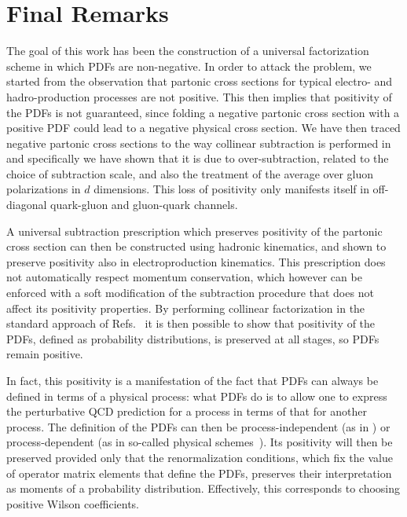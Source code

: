 
\section{Final Remarks}
\label{sec:pos/conc}

The goal of this work has been the construction of a universal factorization
scheme in which PDFs are non-negative.
In order to attack the problem, we started from the observation that \msbar{}
partonic cross sections for typical electro- and hadro-production processes are
not positive. This then implies that positivity of the PDFs is not guaranteed,
since folding a negative partonic cross section with a positive PDF could lead
to a negative physical cross section.
We have then traced negative partonic cross sections to the way collinear
subtraction is performed in \msbar{} and specifically we have shown that it is
due to over-subtraction, related to the choice of subtraction scale, and also
the treatment of the average over gluon polarizations in $d$ dimensions.
This loss of positivity only manifests itself  in off-diagonal quark-gluon and
gluon-quark channels.

A universal subtraction prescription  which preserves positivity of the partonic
cross section can then be constructed using hadronic kinematics, and
shown to preserve positivity also in electroproduction kinematics. This
prescription does not automatically respect momentum conservation,
which however can be enforced with a soft modification of the subtraction
procedure that does not affect its positivity properties. By
performing collinear factorization in the standard approach of
Refs.~\cite{Collins:1981uw,Curci:1980uw} it is then possible to show
that positivity of the PDFs, defined  as probability
distributions, is preserved at all stages, so PDFs remain positive.

In fact, this positivity is a manifestation of the fact that PDFs can
always be defined in terms of a physical process: what PDFs do is to
allow one to express the perturbative QCD prediction for a process in
terms of that for another process. The definition of the PDFs can then
be 
process-independent (as in \msbar{}) or process-dependent (as
in so-called physical schemes~\cite{Catani:1995ze,Diemoz:1987xu}).
Its positivity will then be preserved provided only that the renormalization
conditions, which fix the value of operator matrix elements that
define the PDFs, preserves their interpretation as moments of a
probability distribution. Effectively, this corresponds to choosing
positive Wilson coefficients.

